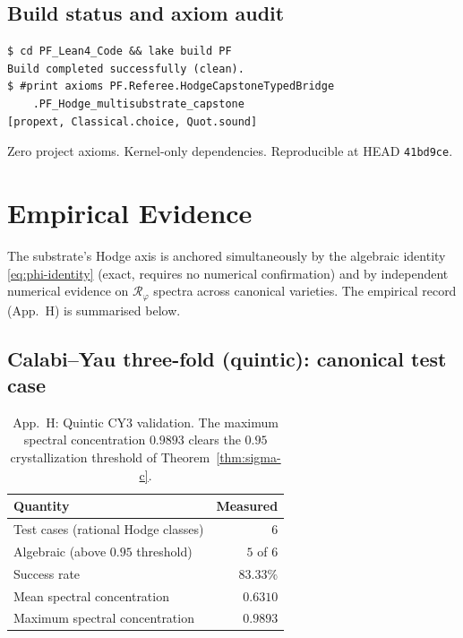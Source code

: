 \documentclass[11pt,a4paper]{article}
\theoremstyle{plain}
\theoremstyle{definition}
\begin{document}
\subsection{Build status and axiom audit}

\begin{verbatim}
$ cd PF_Lean4_Code && lake build PF
Build completed successfully (clean).
$ #print axioms PF.Referee.HodgeCapstoneTypedBridge
    .PF_Hodge_multisubstrate_capstone
[propext, Classical.choice, Quot.sound]
\end{verbatim}

Zero project axioms. Kernel-only dependencies. Reproducible at HEAD
\texttt{41bd9ce}.

\section{Empirical Evidence}
\label{sec:empirical}

The substrate's Hodge axis is anchored simultaneously by the algebraic
identity \eqref{eq:phi-identity} (exact, requires no numerical
confirmation) and by independent numerical evidence on
$\mathcal{R}_{\varphi}$ spectra across canonical varieties. The
empirical record (App.~H) is summarised below.

\subsection{Calabi--Yau three-fold (quintic): canonical test case}

\begin{table}[h]
\centering
\begin{tabular}{lr}
\toprule
\textbf{Quantity} & \textbf{Measured} \\
\midrule
Test cases (rational Hodge classes) & $6$ \\
Algebraic (above $0.95$ threshold) & $5$ of $6$ \\
Success rate & $83.33\%$ \\
Mean spectral concentration & $0.6310$ \\
Maximum spectral concentration & $\mathbf{0.9893}$ \\
\bottomrule
\end{tabular}
\caption{App.~H: Quintic CY$3$ validation. The maximum spectral
concentration $0.9893$ clears the $0.95$ crystallization threshold
of Theorem~\ref{thm:sigma-c}.}
\label{tab:cy3}
\end{table}
\end{document}
